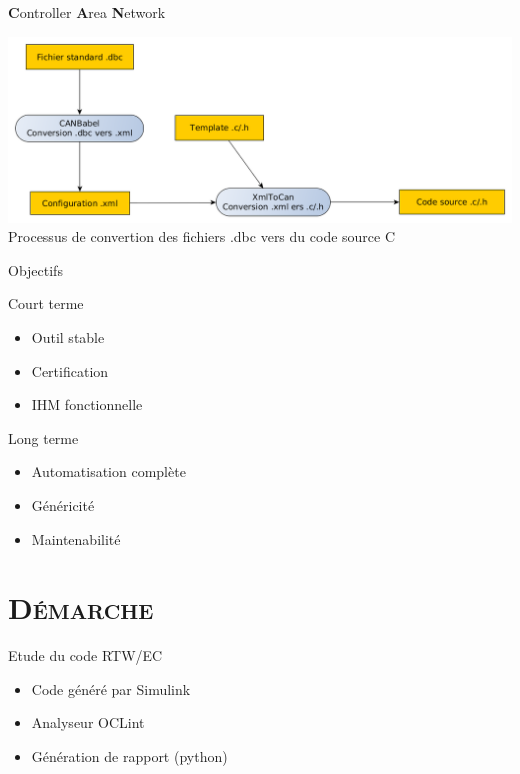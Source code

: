 \documentclass[xcolor=x11names,compress]{beamer}
\begin{document}
\begin{frame}{{\bf C}ontroller {\bf A}rea {\bf N}etwork}
  \begin{center}
	\includegraphics[scale=0.28]{images/dbctocan}\\
	\vfill
	Processus de convertion des fichiers .dbc vers du code source C
  \end{center}
\end{frame}

\begin{frame}{Objectifs}
  \begin{block}{Court terme}{}
	\begin{itemize}
	  \item Outil stable
	  \item Certification
	  \item IHM fonctionnelle
	\end{itemize}
  \end{block}
  \begin{block}{Long terme}{}
	\begin{itemize}
	  \item Automatisation complète
	  \item Généricité
	  \item Maintenabilité
	\end{itemize}
  \end{block}
\end{frame}

\section{\scshape Démarche}
\begin{frame}{Etude du code RTW/EC}
  \begin{itemize}
	\item Code généré par Simulink
	\item Analyseur OCLint
	\item Génération de rapport (python)
  \end{itemize}
\end{frame}
\end{document}
